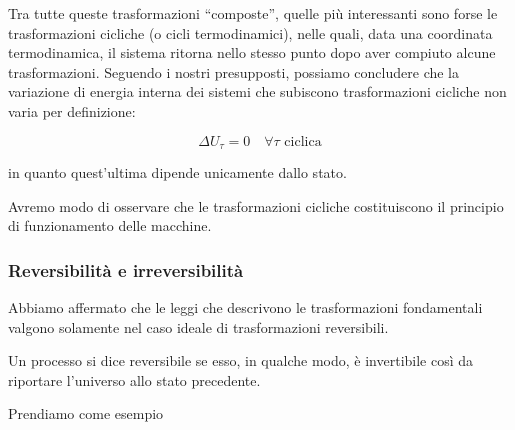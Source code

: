 Tra tutte queste trasformazioni ``composte'', quelle più interessanti
sono forse le trasformazioni cicliche (o cicli termodinamici), nelle
quali, data una coordinata termodinamica, il sistema ritorna nello stesso
punto dopo aver compiuto alcune trasformazioni. Seguendo i nostri presupposti,
possiamo concludere che la variazione di energia interna dei sistemi che
subiscono trasformazioni cicliche non varia per definizione:

\[ \Delta U_\tau = 0 \quad \forall \tau \text{ ciclica} \]

\noindent in quanto quest'ultima dipende unicamente dallo stato.

Avremo modo di osservare che le trasformazioni cicliche costituiscono
il principio di funzionamento delle macchine.


\subsubsection*{Reversibilità e irreversibilità}
Abbiamo affermato che le leggi che descrivono le trasformazioni fondamentali
valgono solamente nel caso ideale di trasformazioni reversibili.

\begin{tcolorbox}[colback = yellow!30, colframe = yellow!30!black, title = {Trasformazioni reversibili}]
    Un processo si dice reversibile se esso, in qualche modo, è
    invertibile così da riportare l'universo allo stato
    precedente.
\end{tcolorbox}

\noindent Prendiamo come esempio